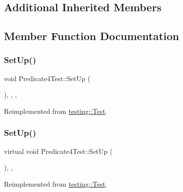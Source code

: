 \subsection*{Additional Inherited Members}


\subsection{Member Function Documentation}
\mbox{\label{class_predicate4_test_ac27e833a2c7b3f889a01ad0a5bde18c6}} 
\subsubsection{\texorpdfstring{SetUp()}{SetUp()}\hspace{0.1cm}{\footnotesize\ttfamily [1/3]}}
{\footnotesize\ttfamily void Predicate4\+Test\+::\+Set\+Up (\begin{DoxyParamCaption}{ }\end{DoxyParamCaption})\hspace{0.3cm}{\ttfamily [inline]}, {\ttfamily [override]}, {\ttfamily [protected]}, {\ttfamily [virtual]}}



Reimplemented from \mbox{\hyperlink{classtesting_1_1_test_a190315150c303ddf801313fd1a777733}{testing\+::\+Test}}.

\mbox{\label{class_predicate4_test_afcf9db5dc68e97291813cdfeb2aaa5d2}} 
\subsubsection{\texorpdfstring{SetUp()}{SetUp()}\hspace{0.1cm}{\footnotesize\ttfamily [2/3]}}
{\footnotesize\ttfamily virtual void Predicate4\+Test\+::\+Set\+Up (\begin{DoxyParamCaption}{ }\end{DoxyParamCaption})\hspace{0.3cm}{\ttfamily [inline]}, {\ttfamily [protected]}, {\ttfamily [virtual]}}



Reimplemented from \mbox{\hyperlink{classtesting_1_1_test_a190315150c303ddf801313fd1a777733}{testing\+::\+Test}}.

